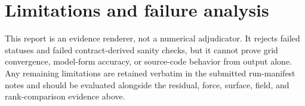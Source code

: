 \documentclass[11pt]{article}
\begin{document}
\section{Limitations and failure analysis}
This report is an evidence renderer, not a numerical adjudicator.  It rejects failed statuses and failed contract-derived sanity checks, but it cannot prove grid convergence, model-form accuracy, or source-code behavior from output alone.  Any remaining limitations are retained verbatim in the submitted run-manifest notes and should be evaluated alongside the residual, force, surface, field, and rank-comparison evidence above.
\end{document}
